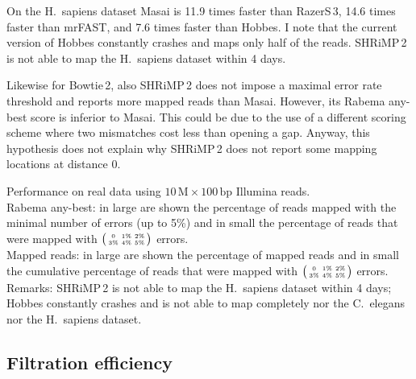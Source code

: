 On the H.~sapiens dataset Masai is 11.9 times faster than RazerS\,3, 14.6 times faster than mrFAST, and 7.6 times faster than Hobbes.
I note that the current version of Hobbes constantly crashes and maps only half of the reads.
SHRiMP\,2 is not able to map the H.~sapiens dataset within 4 days.

Likewise for Bowtie\,2, also SHRiMP\,2 does not impose a maximal error rate threshold and reports more mapped reads than Masai.
However, its Rabema any-best score is inferior to Masai.
This could be due to the use of a different scoring scheme where two mismatches cost less than opening a gap.
Anyway, this hypothesis does not explain why SHRiMP\,2 does not report some mapping locations at distance 0.

\begin{table*}[t]
  \caption[Masai performance on real data]{
    \label{tab:Runtime}
    Performance on real data using $10\,\text{M}\times 100\,\text{bp}$ Illumina reads.\\
	Rabema any-best: in large are shown the percentage of reads mapped with the minimal number of errors (up to 5\%) and in small the percentage of reads that were mapped with $\bigl(\begin{smallmatrix}\mbox{\tiny 0}&\mbox{\tiny 1\%}&\mbox{\tiny 2\%}\\\mbox{\tiny 3\%}&\mbox{\tiny 4\%}&\mbox{\tiny 5\%}\end{smallmatrix}\bigr)$ errors.\\
	Mapped reads: in large are shown the percentage of mapped reads and in small the cumulative percentage of reads that were mapped with $\bigl(\begin{smallmatrix}\mbox{\tiny 0}&\mbox{\tiny 1\%}&\mbox{\tiny 2\%}\\\mbox{\tiny 3\%}&\mbox{\tiny 4\%}&\mbox{\tiny 5\%}\end{smallmatrix}\bigr)$ errors.\\
	Remarks:
    SHRiMP\,2 is not able to map the H.~sapiens dataset within 4 days;
    Hobbes constantly crashes and is not able to map completely nor the C.~elegans nor the H.~sapiens dataset.
  }
	\vspace{-3mm}
	\center
	\sffamily
	\resizebox{1.0\textwidth}{!}
	{
		\renewcommand{\tabcolsep}{0.8ex}
		
	}
\end{table*}


\subsection{Filtration efficiency}

